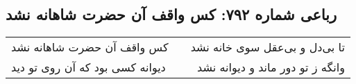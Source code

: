 \begin{center}
\section*{رباعی شماره ۷۹۲: کس واقف آن حضرت شاهانه نشد}
\label{sec:0792}
\begin{longtable}{l p{0.5cm} r}
کس واقف آن حضرت شاهانه نشد
&&
تا بی‌دل و بی‌عقل سوی خانه نشد
\\
دیوانه کسی بود که آن روی تو دید
&&
وانگه ز تو دور ماند و دیوانه نشد
\\
\end{longtable}
\end{center}
